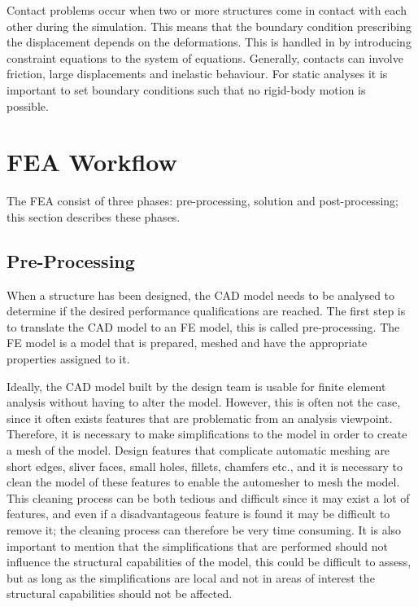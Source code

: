 Contact problems occur when two or more structures come in contact with each other during the simulation. This means that the boundary condition prescribing the displacement depends on the deformations. This is handled in by introducing constraint equations to the system of equations. Generally, contacts can involve friction, large displacements and inelastic behaviour. For static analyses it is important to set boundary conditions such that no rigid-body motion is possible.~\cite[p.~549ff.]{bhatti06}


\section{FEA Workflow} %
\label{sec:fea_workflow}
The FEA consist of three phases: pre-processing, solution and post-processing; this section describes these phases.

\subsection{Pre-Processing} %
\label{sub:pre_processing}
When a structure has been designed, the CAD model needs to be analysed to determine if the desired performance qualifications are reached. The first step is to translate the CAD model to an FE model, this is called pre-processing. The FE model is a model that is prepared, meshed and have the appropriate properties assigned to it.

Ideally, the CAD model built by the design team is usable for finite element analysis without having to alter the model. However, this is often not the case, since it often exists features that are problematic from an analysis viewpoint. Therefore, it is necessary to make simplifications to the model in order to create a mesh of the model. Design features that complicate automatic meshing are short edges, sliver faces, small holes, fillets, chamfers etc., and it is necessary to clean the model of these features to enable the automesher to mesh the model. This cleaning process can be both tedious and difficult since it may exist a lot of features, and even if a disadvantageous feature is found it may be difficult to remove it; the cleaning process can therefore be very time consuming. It is also important to mention that the simplifications that are performed should not influence the structural capabilities of the model, this could be difficult to assess, but as long as the simplifications are local and not in areas of interest the structural capabilities should not be affected.~\cite[p.~181--191]{adams99}

